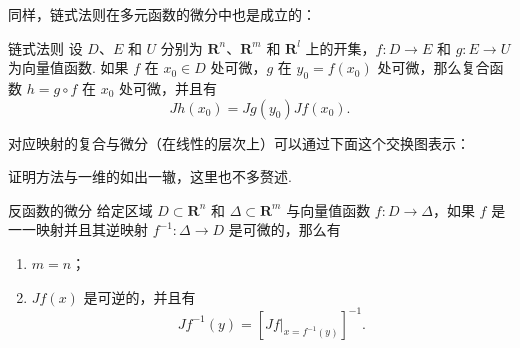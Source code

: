 同样，链式法则在多元函数的微分中也是成立的：

\begin{theorem}{链式法则}{}
    设 $D$、$E$ 和 $U$ 分别为 $\mathbf{R}^n$、$\mathbf{R}^m$ 和 $\mathbf{R}^l$ 上的开集，$f\colon D\to E$ 和 $g\colon E\to U$ 为向量值函数. 如果 $f$ 在 $x_0\in D$ 处可微，$g$ 在 $y_0 = f(x_0)$ 处可微，那么复合函数 $h = g\circ f$ 在 $x_0$ 处可微，并且有\[Jh(x_0) = Jg(y_0)Jf(x_0).\]

    对应映射的复合与微分（在线性的层次上）可以通过下面这个交换图表示：
    \begin{center}
    \end{center}
\end{theorem}

证明方法与一维的如出一辙，这里也不多赘述.

\begin{corollary}{反函数的微分}{}
    给定区域 $D\subset \mathbf{R}^n$ 和 $\Delta \subset \mathbf{R}^m$ 与向量值函数 $f\colon D\to \Delta$，如果 $f$ 是一一映射并且其逆映射 $f^{-1}\colon \Delta\to D$ 是可微的，那么有
    \begin{enumerate}[label=(\arabic*)]
        \item $m = n$；
        \item $Jf(x)$ 是可逆的，并且有 \[Jf^{-1}(y) = \left[Jf\big\rvert_{x = f^{-1}(y)}\right]^{-1}.\]
    \end{enumerate}
\end{corollary}

